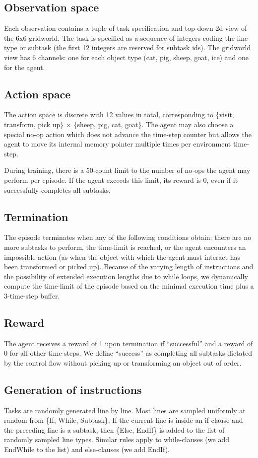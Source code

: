 \documentclass{article}
\begin{document}
\subsection{Observation space}
Each observation contains a tuple of task specification and top-down 2d view of
the 6x6 gridworld. The task is specified as a sequence of integers coding the
line type or subtask (the first 12 integers are reserved for subtask ids). The
gridworld view has 6 channels: one for each object type (cat, pig, sheep, goat,
ice) and one for the agent.  
\subsection{Action space}
The action space is discrete with 12 values in total, corresponding to \{visit, transform, pick up\} $\times$ \{sheep, pig, cat, goat\}. The agent may also choose a special no-op action which does not advance the time-step counter but allows the agent to move its internal memory pointer  multiple times per environment time-step. 

During training, there is a 50-count limit to the number of no-ops the agent may perform per episode. If the agent exceeds this limit, its reward is 0, even if it successfully completes all subtasks. 
\subsection{Termination}
The episode terminates when any of the following conditions obtain: there are no more subtasks to perform, the time-limit is reached, or the agent encounters an impossible action (as when the object with which the agent must interact has been transformed or picked up).
Because of the varying length of instructions and the possibility of extended execution lengths due to while loops, we dynamically compute the time-limit of the episode based on the minimal execution time plus a 3-time-step buffer.
\subsection{Reward}
The agent receives a reward of 1 upon termination if ``successful'' and a reward of 0 for all other time-steps. We define ``success'' as completing all subtasks dictated by the control flow without picking up or transforming an object out of order.

\subsection{Generation of instructions}
Tasks are randomly generated line by line. Most lines are sampled uniformly at
random from \{If, While, Subtask\}. If the current line is inside an if-clause and
the preceding line is a subtask, then \{Else, EndIf\} is added to the list of
randomly sampled line types. Similar rules apply to while-clauses (we add
EndWhile to the list) and else-clauses (we add EndIf). 
\end{document}
